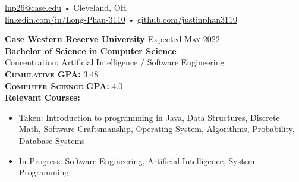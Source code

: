 \documentclass[a4paper,11pt]{article}
\begin{document}
 
 
\begin{center} 
\href{mailto:lnp26@case.edu}{lnp26@case.edu} • Cleveland, OH \\
\href{https://linkedin.com/in/Long-Phan-3110/}{linkedin.com/in/Long-Phan-3110} • \href{http://github.com/justinphan3110}{github.com/justinphan3110}
\noindent\makebox[\linewidth]{\rule{\paperwidth}{2pt}}
\end{center}

\begin{flushleft}
	\textbf{Case Western Reserve University } \hspace{1cm} Expected \textsc{May} 2022 \\
	\textbf{Bachelor of Science in Computer Science} \\
	Concentration: Artificial Intelligence / Software Engineering \\
	\textbf{\textsc{Cumulative GPA:}} 3.48 \\
	\textbf{\textsc{Computer Science GPA:}} 4.0 \\ 
    \textbf{Relevant Courses:} 
    \vspace{-\topsep}
    	\begin{itemize}
    		\setlength{\parskip}{0pt}
    		\setlength{\itemsep}{0pt plus 1pt}
    		\item Taken: Introduction to programming in Java, Data Structures, Discrete Math, Software Craftsmanship, Operating System, Algorithms, Probability, Database Systems 
    		\item In Progress: Software Engineering, Artificial Intelligence, System Programming
        \end{itemize}
    		
	\centering{\noindent\makebox{\rule{8cm}{1.5pt}}}
\end{flushleft}
\end{document}
